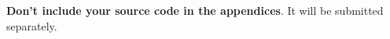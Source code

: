 \documentclass{l4proj}
\begin{document}
\begin{appendices}





\textbf{Don't include your source code in the appendices}. It will be
submitted separately.
\cite{Orw68}
\cite{Pey17}

\citet{Orw68}

\citet{TIOBE}

\end{appendices}






\end{document}

